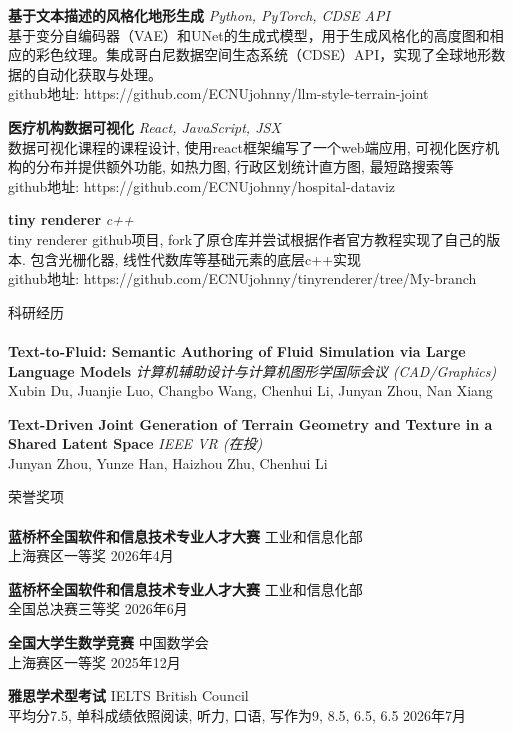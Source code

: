 \documentclass[a4paper]{article}
\newcommand{\lineunder} {
    \vspace*{-8pt} \\
    \hspace*{-18pt} \hrulefill \\
}
\newcommand{\header} [1] {
    {\hspace*{-18pt}\vspace*{6pt} \textsc{#1}}
    \vspace*{-6pt} \lineunder
}
\begin{document}
{\textbf{基于文本描述的风格化地形生成}} {\sl Python, PyTorch, CDSE API} \\
基于变分自编码器（VAE）和UNet的生成式模型，用于生成风格化的高度图和相应的彩色纹理。集成哥白尼数据空间生态系统（CDSE）API，实现了全球地形数据的自动化获取与处理。\\
github地址: https://github.com/ECNUjohnny/llm-style-terrain-joint \\
\vspace*{3mm}

{\textbf{医疗机构数据可视化}} {\sl React, JavaScript, JSX} \\
数据可视化课程的课程设计, 使用react框架编写了一个web端应用, 可视化医疗机构的分布并提供额外功能, 如热力图, 行政区划统计直方图, 最短路搜索等 \\
github地址: https://github.com/ECNUjohnny/hospital-dataviz
\vspace*{3mm}

{\textbf{tiny renderer}} {\sl c++} \\
tiny renderer github项目, fork了原仓库并尝试根据作者官方教程实现了自己的版本. 包含光栅化器, 线性代数库等基础元素的底层c++实现 \\
github地址: https://github.com/ECNUjohnny/tinyrenderer/tree/My-branch 
\vspace*{3mm}

\header{科研经历}
{\textbf{Text-to-Fluid: Semantic Authoring of Fluid Simulation via Large Language Models}} {\sl 计算机辅助设计与计算机图形学国际会议 (CAD/Graphics)} \\
Xubin Du, Juanjie Luo, Changbo Wang, Chenhui Li, Junyan Zhou, Nan Xiang
\vspace*{3mm}

{\textbf{Text-Driven Joint Generation of Terrain Geometry and Texture in a Shared Latent Space}} {\sl IEEE VR (在投)} \\
Junyan Zhou, Yunze Han, Haizhou Zhu, Chenhui Li
\vspace*{3mm}

\header{荣誉奖项}
\textbf{蓝桥杯全国软件和信息技术专业人才大赛} \hfill 工业和信息化部\\
上海赛区一等奖 \hfill 2026年4月\\
\vspace*{3mm}

\textbf{蓝桥杯全国软件和信息技术专业人才大赛} \hfill 工业和信息化部\\
全国总决赛三等奖 \hfill 2026年6月\\
\vspace*{3mm}

\textbf{全国大学生数学竞赛} \hfill 中国数学会\\
上海赛区一等奖 \hfill 2025年12月\\
\vspace*{3mm}

\textbf{雅思学术型考试} \hfill IELTS British Council\\
平均分7.5, 单科成绩依照阅读, 听力, 口语, 写作为9, 8.5, 6.5, 6.5 \hfill 2026年7月
\vspace*{3mm}

\ 
\end{document}
